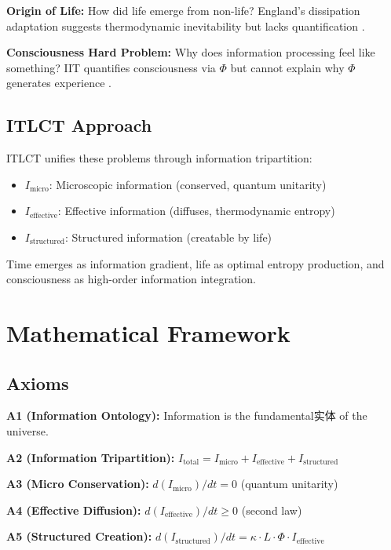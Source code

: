 \documentclass[12pt,a4paper]{article}
\begin{document}
\textbf{Origin of Life:} How did life emerge from non-life? England's dissipation adaptation suggests thermodynamic inevitability but lacks quantification \citep{england2013statistical}.

\textbf{Consciousness Hard Problem:} Why does information processing feel like something? IIT quantifies consciousness via $\Phi$ but cannot explain why $\Phi$ generates experience \citep{tononi2004information,chalmers1995facing}.

\subsection{ITLCT Approach}

ITLCT unifies these problems through information tripartition:
\begin{itemize}
\item $I_{\text{micro}}$: Microscopic information (conserved, quantum unitarity)
\item $I_{\text{effective}}$: Effective information (diffuses, thermodynamic entropy)
\item $I_{\text{structured}}$: Structured information (creatable by life)
\end{itemize}

Time emerges as information gradient, life as optimal entropy production, and consciousness as high-order information integration.

\section{Mathematical Framework}

\subsection{Axioms}

\textbf{A1 (Information Ontology):} Information is the fundamental实体 of the universe.

\textbf{A2 (Information Tripartition):} $I_{\text{total}} = I_{\text{micro}} + I_{\text{effective}} + I_{\text{structured}}$

\textbf{A3 (Micro Conservation):} $d(I_{\text{micro}})/dt = 0$ (quantum unitarity)

\textbf{A4 (Effective Diffusion):} $d(I_{\text{effective}})/dt \geq 0$ (second law)

\textbf{A5 (Structured Creation):} $d(I_{\text{structured}})/dt = \kappa \cdot L \cdot \Phi \cdot I_{\text{effective}}$
\end{document}
